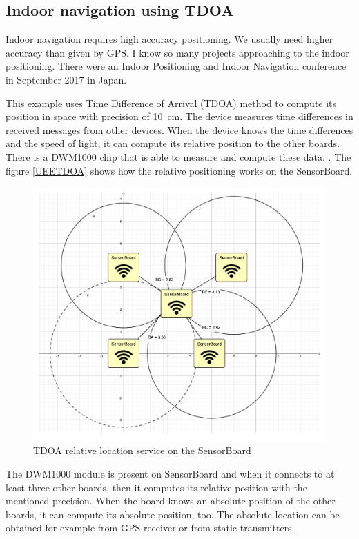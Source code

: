 \subsection{Indoor navigation using TDOA}
Indoor navigation requires high accuracy positioning. We usually need higher accuracy than given by GPS. I know so many projects approaching to the indoor positioning. There were an Indoor Positioning and Indoor Navigation conference in September 2017 in Japan.

This example uses Time Difference of Arrival (TDOA) method to compute its position in space with precision of \SI{10}{cm}. The device measures time differences in received messages from other devices. When the device knows the time differences and the speed of light, it can compute its relative position to the other boards. There is a DWM1000 chip that is able to measure and compute these data. \cite{decawave:DWM1000}. The figure \ref{UEETDOA} shows how the relative positioning works on the SensorBoard.

\begin{figure}[H]
	\centering
	\label{UETDOA}
	\caption{TDOA relative location service on the SensorBoard}
	\includegraphics[trim=5cm 6cm 5cm 5cm, clip, width=16cm]{img/UsageExamplesTDOA.pdf}
\end{figure}

The DWM1000 \cite{decawave:DWM1000} module is present on SensorBoard and when it connects to at least three other boards, then it computes its relative position with the mentioned precision. When the board knows an absolute position of the other boards, it can compute its absolute position, too. The absolute location can be obtained for example from GPS receiver or from static transmitters.

